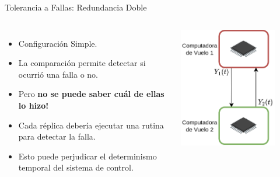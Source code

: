\begin{frame}{Tolerancia a Fallas: Redundancia Doble}
	\begin{columns}
			\begin{itemize}
				\item Configuración Simple.
				\item La comparación permite detectar si ocurrió una falla o no.
				\item Pero \textbf{no se puede saber cuál de ellas lo hizo!}
				\item Cada réplica debería ejecutar una rutina para detectar la falla.
				\item Esto puede perjudicar el determinismo temporal del sistema de control.
			\end{itemize}
			\includegraphics[width=0.8\textwidth]{img/redundancia_doble.png}
	\end{columns}
\end{frame}

